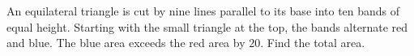 An equilateral triangle is cut by nine lines parallel to its base into ten bands of equal height. Starting with the small triangle at the top, the bands alternate red and blue. The blue area exceeds the red area by $ 20 $. Find the total area.
